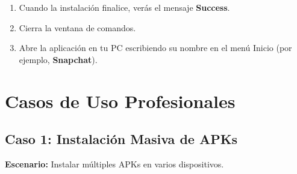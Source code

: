 \documentclass[
  doc,
  floatsintext,
  longtable,
  a4paper,
  nolmodern,
  notxfonts,
  notimes,
  12pt,
  colorlinks=true,linkcolor=blue,citecolor=blue,urlcolor=blue]{apa7}
\newenvironment{Shaded}{\begin{snugshade}}{\end{snugshade}}
\newcommand{\AttributeTok}[1]{\textcolor[rgb]{0.40,0.45,0.13}{#1}}
\newcommand{\BuiltInTok}[1]{\textcolor[rgb]{0.00,0.23,0.31}{#1}}
\newcommand{\CommentTok}[1]{\textcolor[rgb]{0.37,0.37,0.37}{#1}}
\newcommand{\ControlFlowTok}[1]{\textcolor[rgb]{0.00,0.23,0.31}{\textbf{#1}}}
\newcommand{\ExtensionTok}[1]{\textcolor[rgb]{0.00,0.23,0.31}{#1}}
\newcommand{\FunctionTok}[1]{\textcolor[rgb]{0.28,0.35,0.67}{#1}}
\newcommand{\KeywordTok}[1]{\textcolor[rgb]{0.00,0.23,0.31}{\textbf{#1}}}
\newcommand{\NormalTok}[1]{\textcolor[rgb]{0.00,0.23,0.31}{#1}}
\newcommand{\OperatorTok}[1]{\textcolor[rgb]{0.37,0.37,0.37}{#1}}
\newcommand{\PreprocessorTok}[1]{\textcolor[rgb]{0.68,0.00,0.00}{#1}}
\newcommand{\StringTok}[1]{\textcolor[rgb]{0.13,0.47,0.30}{#1}}
\newcommand{\VariableTok}[1]{\textcolor[rgb]{0.07,0.07,0.07}{#1}}
\begin{document}
\begin{enumerate}
  \textbf{Ejemplo:}

\begin{Shaded}
\begin{Highlighting}[]
\ExtensionTok{adb.exe}\NormalTok{ install snapchat.apk}
\end{Highlighting}
\end{Shaded}
\item
  Cuando la instalación finalice, verás el mensaje \textbf{Success}.
\item
  Cierra la ventana de comandos.
\item
  Abre la aplicación en tu PC escribiendo su nombre en el menú Inicio
  (por ejemplo, \textbf{Snapchat}).
\end{enumerate}

\section{Casos de Uso Profesionales}\label{casos-de-uso-profesionales}

\subsection{Caso 1: Instalación Masiva de
APKs}\label{caso-1-instalaciuxf3n-masiva-de-apks}

\textbf{Escenario:} Instalar múltiples APKs en varios dispositivos.

\begin{Shaded}
\end{Shaded}
\end{document}
